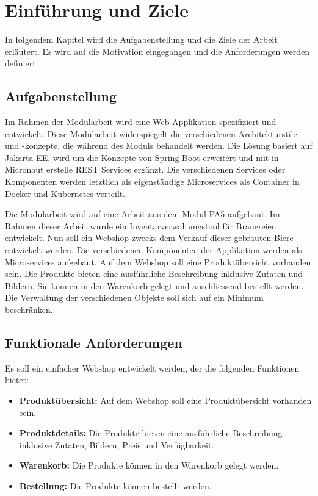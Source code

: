 
\section{Einführung und Ziele}
\label{sec:einfuehrung_und_ziele}
In folgendem Kapitel wird die Aufgabenstellung und die Ziele der Arbeit erläutert.
Es wird auf die Motivation eingegangen und die Anforderungen werden definiert.

\subsection{Aufgabenstellung}
\label{subsec:aufgabenstellung}
Im Rahmen der Modularbeit wird eine Web-Applikation spezifiziert und entwickelt.
Diese Modularbeit widerspiegelt die verschiedenen Architekturstile und -konzepte,
die während des Moduls behandelt werden.
Die Lösung basiert auf Jakarta EE, wird  um die Konzepte von Spring Boot erweitert und
mit in Micronaut erstelle REST Services ergänzt.
Die verschiedenen Services oder Komponenten werden letztlich als
eigenständige Microservices als Container in Docker und Kubernetes verteilt.

Die Modularbeit wird auf eine Arbeit aus dem Modul PA5 aufgebaut. Im Rahmen dieser Arbeit
wurde ein Inventarverwaltungstool für Brauereien entwickelt. Nun soll ein Webshop zwecks
dem Verkauf dieser gebrauten Biere entwickelt werden. Die verschiedenen Komponenten der 
Applikation werden als Microservices aufgebaut. Auf dem Webshop soll eine Produktübersicht 
vorhanden sein. Die Produkte bieten eine ausführliche Beschreibung inklusive Zutaten und Bildern. 
Sie können in den Warenkorb gelegt und anschliessend bestellt werden. Die Verwaltung der 
verschiedenen Objekte soll sich auf ein Minimum beschränken.

\subsection{Funktionale Anforderungen}
\label{subsec:funktionaleanforderungen}
Es soll ein einfacher Webshop entwickelt werden, der die folgenden Funktionen bietet:

\begin{itemize}
    \item \textbf{Produktübersicht:} Auf dem Webshop soll eine Produktübersicht vorhanden sein.
    \item \textbf{Produktdetails:} Die Produkte bieten eine ausführliche Beschreibung inklusive Zutaten, Bildern, Preis und Verfügbarkeit.
    \item \textbf{Warenkorb:} Die Produkte können in den Warenkorb gelegt werden.
    \item \textbf{Bestellung:} Die Produkte können bestellt werden.
\end{itemize}

